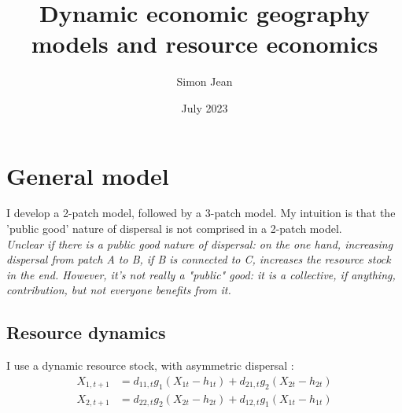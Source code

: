 \documentclass{article}
\title{Dynamic economic geography models and resource economics}
\author{Simon Jean}
\date{July 2023}
\begin{document}
\maketitle

\section{General model}
I develop a 2-patch model, followed by a 3-patch model. My intuition is that the 'public good' nature of dispersal is not comprised in a 2-patch model. \\
\textit{Unclear if there is a public good nature of dispersal: on the one hand, increasing dispersal from patch A to B, if B is connected to C, increases the resource stock in the end. However, it's not really a "public" good: it is a collective, if anything, contribution, but not everyone benefits from it. }
\subsection{Resource dynamics}
I use a dynamic resource stock, with asymmetric dispersal : 
\begin{align}
    X_{1,t+1} &= d_{11,t} g_1(X_{1t}-h_{1t}) + d_{21,t}g_2(X_{2t}-h_{2t})\\
     X_{2,t+1} &= d_{22,t} g_2(X_{2t}-h_{2t}) + d_{12,t}g_1(X_{1t}-h_{1t})
\end{align}
    
\end{document}
